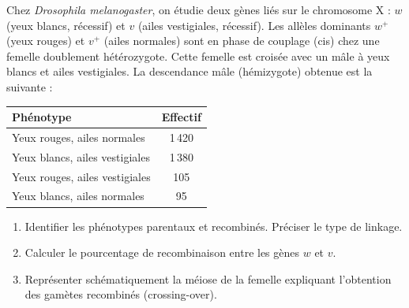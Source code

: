 \documentclass[11pt]{article}
\begin{document}
\begin{exercice}
Chez \textit{Drosophila melanogaster}, on étudie deux gènes liés sur le chromosome X : $w$ (yeux blancs, récessif) et $v$ (ailes vestigiales, récessif). Les allèles dominants $w^+$ (yeux rouges) et $v^+$ (ailes normales) sont en phase de couplage (cis) chez une femelle doublement hétérozygote.
Cette femelle est croisée avec un mâle à yeux blancs et ailes vestigiales.
La descendance mâle (hémizygote) obtenue est la suivante :
\begin{center}
\begin{tabular}{|l|c|}
\hline
Phénotype & Effectif \\
\hline
Yeux rouges, ailes normales & 1\,420 \\
Yeux blancs, ailes vestigiales & 1\,380 \\
Yeux rouges, ailes vestigiales & 105 \\
Yeux blancs, ailes normales & 95 \\
\hline
\end{tabular}
\end{center}
\begin{enumerate}
    \item Identifier les phénotypes parentaux et recombinés. Préciser le type de linkage.
    \item Calculer le pourcentage de recombinaison entre les gènes $w$ et $v$.
    \item Représenter schématiquement la méiose de la femelle expliquant l'obtention des gamètes recombinés (crossing-over).
\end{enumerate}
\end{exercice}
\end{document}
